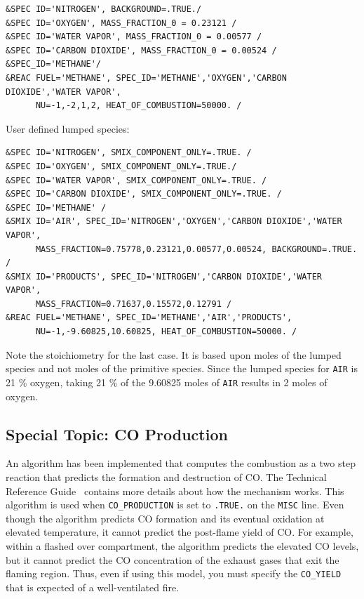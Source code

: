 \documentclass[11pt]{book}
\newcommand{\ct}{\tt\small}
\begin{document}
\footnotesize
\begin{verbatim}
&SPEC ID='NITROGEN', BACKGROUND=.TRUE./
&SPEC ID='OXYGEN', MASS_FRACTION_0 = 0.23121 /
&SPEC ID='WATER VAPOR', MASS_FRACTION_0 = 0.00577 /
&SPEC ID='CARBON DIOXIDE', MASS_FRACTION_0 = 0.00524 /
&SPEC_ID='METHANE'/
&REAC FUEL='METHANE', SPEC_ID='METHANE','OXYGEN','CARBON DIOXIDE','WATER VAPOR',
      NU=-1,-2,1,2, HEAT_OF_COMBUSTION=50000. /
\end{verbatim} \normalsize


User defined lumped species:

\footnotesize
\begin{verbatim}
&SPEC ID='NITROGEN', SMIX_COMPONENT_ONLY=.TRUE. /
&SPEC ID='OXYGEN', SMIX_COMPONENT_ONLY=.TRUE./
&SPEC ID='WATER VAPOR', SMIX_COMPONENT_ONLY=.TRUE. /
&SPEC ID='CARBON DIOXIDE', SMIX_COMPONENT_ONLY=.TRUE. /
&SPEC ID='METHANE' /
&SMIX ID='AIR', SPEC_ID='NITROGEN','OXYGEN','CARBON DIOXIDE','WATER VAPOR',
      MASS_FRACTION=0.75778,0.23121,0.00577,0.00524, BACKGROUND=.TRUE. /
&SMIX ID='PRODUCTS', SPEC_ID='NITROGEN','CARBON DIOXIDE','WATER VAPOR',
      MASS_FRACTION=0.71637,0.15572,0.12791 /
&REAC FUEL='METHANE', SPEC_ID='METHANE','AIR','PRODUCTS',
      NU=-1,-9.60825,10.60825, HEAT_OF_COMBUSTION=50000. /
\end{verbatim} \normalsize

\noindent
Note the stoichiometry for the last case.  It is based upon moles of the lumped species and not moles of the primitive species.
Since the lumped species for {\ct AIR} is 21 \% oxygen, taking 21 \% of the 9.60825 moles of {\ct AIR} results in 2 moles of oxygen.


\subsection{Special Topic: CO Production}

\label{info:CO}

An algorithm has been implemented that computes the combustion as a two step reaction that
predicts the formation and destruction of CO.  The Technical Reference Guide~\cite{FDS_Math_Guide}
contains more details about how the mechanism works. This algorithm is used when
{\ct CO\_PRODUCTION} is set to {\ct .TRUE.} on the {\ct MISC} line. Even though the algorithm predicts
CO formation and its eventual oxidation at elevated temperature, it cannot predict the post-flame
yield of CO. For example, within a flashed over compartment, the algorithm predicts the elevated
CO levels, but it cannot predict the CO concentration of the exhaust gases that exit the flaming region.
Thus, even if using this model, you must specify the {\ct CO\_YIELD} that is expected of a well-ventilated fire.
\end{document}
